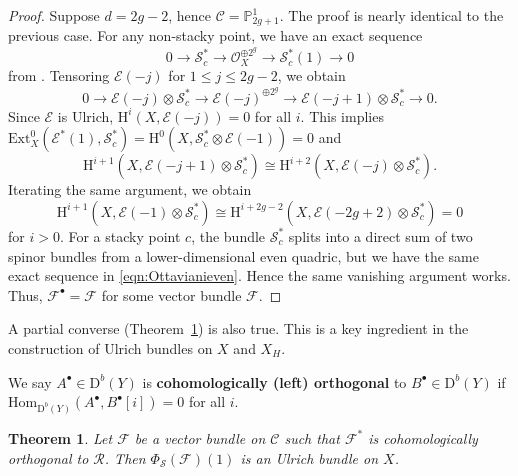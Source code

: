 \documentclass[12pt, letterpaper]{amsart}
\newtheorem{theorem}{Theorem}[section]
\theoremstyle{definition}
\newcommand{\PP}{\mathbb{P} }
\newcommand{\cC}{\mathcal{C} }
\newcommand{\cE}{\mathcal{E} }
\newcommand{\cF}{\mathcal{F} }
\newcommand{\cO}{\mathcal{O} }
\newcommand{\cR}{\mathcal{R} }
\newcommand{\cS}{\mathcal{S} }
\newcommand{\rD}{\mathrm{D} }
\newcommand{\rH}{\mathrm{H} }
\newcommand{\hX}{{X_H} }
\def\rHom{\mathrm{Hom} }
\def\Ext{\mathrm{Ext} }
\begin{document}
\begin{proof}
Suppose \(d = 2g - 2\), hence \(\cC = \PP_{2g+1}^1\). The proof is nearly identical to the previous case. For any non-stacky point, we have an exact sequence
\begin{equation}\label{eqn:Ottavianiodd}
0 \to \cS_c^* \to \cO_X^{\oplus 2^g} \to \cS_c^*(1) \to 0
\end{equation}
from \cite[Theorem~2.8]{Ott88}. Tensoring \(\cE(-j)\) for \(1 \le j \le 2g-2\), we obtain
\[0 \to \cE(-j) \otimes \cS_c^* \to \cE(-j)^{\oplus 2^g} \to \cE(-j+1) \otimes \cS_c^* \to 0.\]
Since \(\cE\) is Ulrich, \(\rH^i(X, \cE(-j)) = 0\) for all \(i\). This implies \(\Ext^0_X(\cE^*(1), \cS_c^*) = \rH^0(X, \cS_c^* \otimes \cE(-1)) = 0\) and
\[\rH^{i+1}(X, \cE(-j+1)\otimes \cS_c^*) \cong \rH^{i+2}(X, \cE(-j) \otimes \cS_c^*).\]
Iterating the same argument, we obtain
\[\rH^{i+1}(X, \cE(-1) \otimes \cS_c^*) \cong \rH^{i+2g-2}(X, \cE(-2g+2)\otimes \cS_c^*) = 0\]
for \(i > 0\). For a stacky point \(c\), the bundle \(\cS_c^*\) splits into a direct sum of two spinor bundles from a lower-dimensional even quadric, but we have the same exact sequence in \eqref{eqn:Ottavianieven}. Hence the same vanishing argument works. Thus, \(\cF^\bullet = \cF\) for some vector bundle \(\cF\).
\end{proof}

A partial converse (Theorem~\ref{thm:existenceUlrich}) is also true. This is a key ingredient in the construction of Ulrich bundles on \(X\) and \(\hX\).

We say \(A^\bullet \in \rD^b(Y)\) is \textbf{cohomologically (left) orthogonal} to \(B^\bullet \in \rD^b(Y)\) if \(\rHom_{\rD^b(Y)}(A^\bullet, B^\bullet[i]) = 0\) for all \(i\).

\begin{theorem}\label{thm:existenceUlrich}
Let \(\cF\) be a vector bundle on \(\cC\) such that \(\cF^*\) is cohomologically orthogonal to \(\cR\). Then \(\Phi_{\cS}(\cF)(1)\) is an Ulrich bundle on \(X\).
\end{theorem}
\end{document}
